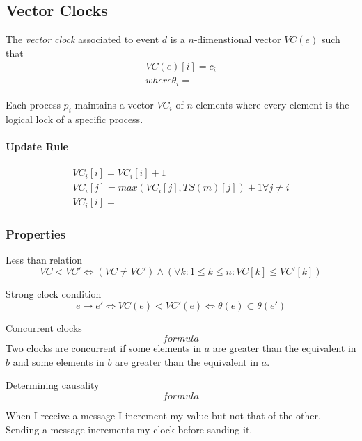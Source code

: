 \documentclass{article}
\begin{document}
\subsection{Vector Clocks}
The \textit{vector clock} associated to event $d$ is a $n$-dimenstional vector $VC(e)$ such that
\begin{align*}
VC(e)[i] = c_i \\
where \theta_i = 
\end{align*}

Each process $p_i$ maintains a vector $VC_i$ of $n$ elements where every element is the logical lock of a specific process. 

\paragraph{Update Rule}
\begin{gather*}
VC_i[i] = VC_i[i]+1 \\
VC_i[j] = max(VC_i[j], TS(m)[j])+1 \forall j\neq i \\
VC_i[i] = 
\end{gather*}

\subsubsection{Properties}
Less than relation 
$$VC < VC' \iff (VC\neq VC') \wedge (\forall k:1\leq k \leq n: VC[k]\leq VC'[k])$$

Strong clock condition
$$e\to e' \iff VC(e) < VC'(e) \iff \theta(e) \subset \theta(e')$$

Concurrent clocks
$$formula$$
Two clocks are concurrent if some elements in $a$ are greater than the equivalent in $b$ and some elements in $b$ are greater than the equivalent in $a$.

Determining causality
$$formula$$

\begin{callout}{}
    When I receive a message I increment my value but not that of the other.\\
    Sending a message increments my clock before sanding it.\\
\end{callout}
\end{document}
